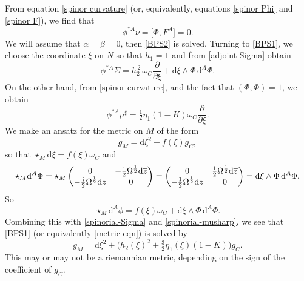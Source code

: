 \documentclass[pdftex]{sigma}
\newcommand{\1}{{\mathbb{1}}}
\def \d{\mathrm{d}}
\newcommand{\ol}{\overline}
\numberwithin{equation}{section}
\begin{document}
From equation \eqref{spinor curvature} (or, equivalently, equations \eqref{spinor Phi} and \eqref{spinor F}), we find that
\begin{equation*}
\phi^{\ast A}\nu=\bigl[\Phi,F^A\bigr]=0.
\end{equation*}
We will assume that $\alpha=\beta=0$, then \eqref{BPS2} is solved. Turning to \eqref{BPS1}, we choose the coordinate $\xi$ on $N$ so that $h_1=1$ and from \eqref{adjoint-Sigma} obtain
\begin{equation}
\label{spinorial-Sigma}
\phi^{\ast A}\Sigma = h_2^{\,2}\,\omega_C\frac{\partial}{\partial \xi} + \d\xi\wedge\Phi\,\d^A\Phi.
\end{equation}
On the other hand, from \eqref{spinor curvature}, and the fact that $(\Phi,\Phi)=1$, we obtain
\begin{equation}
\label{spinorial-musharp}
\phi^{\ast A}\mu^\sharp = \tfrac{1}{2}\eta_1(1-K)\omega_C\frac{\partial}{\partial \xi}.
\end{equation}
We make an ansatz for the metric on $M$ of the form
\begin{equation*}
g_M = \d\xi^2 + f(\xi)g_C,
\end{equation*}
so that $\star_{M} \d\xi = f(\xi)\omega_C$ and
\begin{equation*}
\star_{M} \d^A\Phi = \star_{M} \begin{pmatrix} 0&-\frac{{\rm i}}{2}\Omega^{\frac12}\d\ol{z} \\ -\frac{{\rm i}}{2}\Omega^{\frac12}\d z & 0 \end{pmatrix} = \begin{pmatrix} 0&\frac{1}{2}\Omega^{\frac12}\d\ol{z} \\ -\frac{1}{2}\Omega^{\frac12}\d z & 0 \end{pmatrix} = \d\xi\wedge\Phi\, \d^A\Phi.
\end{equation*}
So
\begin{equation*}
\star_{M} \d^A\phi = f(\xi)\omega_C + \d\xi\wedge\Phi\, \d^A\Phi.
\end{equation*}
Combining this with \eqref{spinorial-Sigma} and \eqref{spinorial-musharp}, we see that \eqref{BPS1} (or equivalently \eqref{metric-eqn}) is solved by
\begin{equation}
\label{spinorial-metric}
g_M = \d\xi^2 + \bigl(h_2(\xi)^{2}+\tfrac32\eta_1(\xi)(1-K)\bigr)g_C.
\end{equation}
This may or may not be a riemannian metric, depending on the sign of the coefficient of $g_C$.
\end{document}
